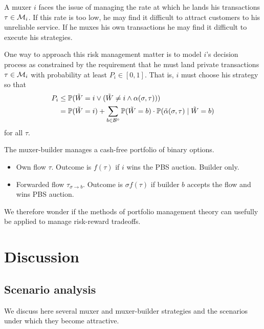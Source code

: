 A muxer $i$ faces the issue of managing the rate at which he lands his transactions $\tau\in\mathcal{M}_i$.
%
If this rate is too low, he may find it difficult to attract customers to his unreliable service.
%
If he muxes his own transactions he may find it difficult to execute his strategies.

One way to approach this risk management matter is to model $i$'s decision process as constrained by the requirement that he must land private transactions $\tau\in\mathcal{M}_i$ with probability at least $P_i\in[0,1]$. 
%
That is, $i$ must choose his strategy so that
%
\begin{align*}
  P_i &\leq \mathbb{P}(\tilde{W}=i \vee (\tilde{W}\neq i \wedge \alpha(\sigma,\tau))) \\
      &=    \mathbb{P}(\tilde{W}=i) + \sum_{b\in\mathcal{B}^\circ}\mathbb{P}(\tilde{W}=b)\cdot\mathbb{P}(\tilde{\alpha}(\sigma,\tau) \mid \tilde W=b) 
\end{align*}
%
for all $\tau$. 


\begin{remark*}

  The muxer-builder manages a cash-free portfolio of binary options.
  \begin{itemize}
    \item Own flow $\tau$. Outcome is $f(\tau)$ if $i$ wins the PBS auction. Builder only.
    \item Forwarded flow $\tau_{\sigma\rightarrow b}$. Outcome is $\sigma f(\tau)$ if builder $b$ accepts the flow and wins PBS auction.
  \end{itemize}
  We therefore wonder if the methods of portfolio management theory can usefully be applied to manage risk-reward tradeoffs.

\end{remark*}




\section*{Discussion}


\subsection*{Scenario analysis}

We discuss here several muxer and muxer-builder strategies and the scenarios under which they become attractive.

